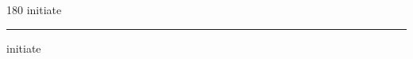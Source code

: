 
\begin{frame}
\begin{center}
\begin{turn}{180}
{\fontsize{2.5cm}{1em}\selectfont initiate}
\end{turn}
\vspace{1em}\par  
\hrule
\vspace{1em}\par  
{\fontsize{2.5cm}{1em}\selectfont initiate}
\end{center}
\end{frame}
